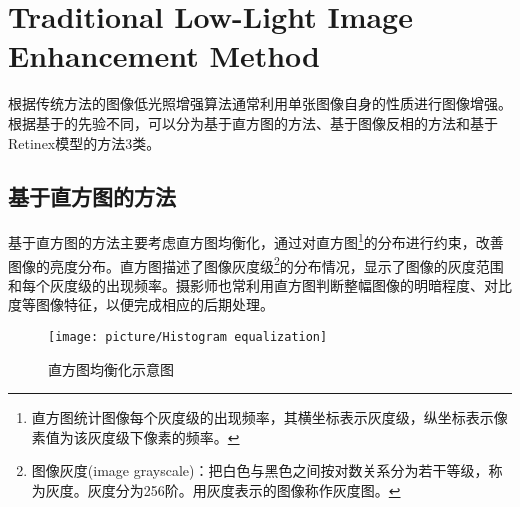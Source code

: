 \documentclass[letterpaper,10pt]{article}
\begin{document}
%	
%

	\section{Traditional Low-Light Image Enhancement Method}
	
	根据传统方法的图像低光照增强算法通常利用单张图像自身的性质进行图像增强。根据基于的先验不同，可以分为基于直方图的方法、基于图像反相的方法和基于Retinex模型的方法3类。
	
	
		\subsection{基于直方图的方法}
		
		基于直方图的方法主要考虑直方图均衡化，通过对直方图\footnote{直方图统计图像每个灰度级的出现频率，其横坐标表示灰度级，纵坐标表示像素值为该灰度级下像素的频率。}的分布进行约束，改善图像的亮度分布。直方图描述了图像灰度级\footnote{图像灰度(image grayscale)：把白色与黑色之间按对数关系分为若干等级，称为灰度。灰度分为256阶。用灰度表示的图像称作灰度图。}的分布情况，显示了图像的灰度范围和每个灰度级的出现频率。摄影师也常利用直方图判断整幅图像的明暗程度、对比度等图像特征，以便完成相应的后期处理。
		
        \begin{figure}[htbp]
			\centering 
			\texttt{[image: picture/Histogram equalization]}
			\caption{
				\label{fig: Histogram equalization} 
				直方图均衡化示意图
			}
		\end{figure}
		
\end{document}
